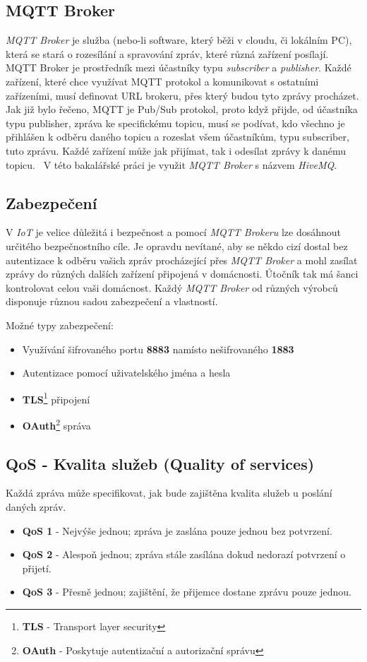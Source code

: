 \subsection{MQTT Broker}
\emph{MQTT Broker} je služba (nebo-li software, který běži v cloudu, či lokálním PC), která se stará o rozesílání a spravování zpráv, které různá zařízení posílají. MQTT Broker je prostředník mezi účastníky typu \emph{subscriber} a \emph{publisher}.
Každé zařízení, které chce využívat MQTT protokol a komunikovat s ostatními zařízeními, musí definovat URL brokeru, přes který budou tyto zprávy procházet.
Jak již bylo řečeno, MQTT je Pub/Sub protokol, proto když přijde, od účastníka typu publisher, zpráva ke specifickému topicu, musí se podívat, kdo všechno je přihlášen k odběru daného topicu a rozeslat všem účastníkům, typu subscriber, tuto zprávu.
Každé zařízení může jak přijímat, tak i odesílat zprávy k danému topicu.~\cite{wiki:mqtt_broker} V této bakalářské práci je využit \emph{MQTT Broker} s názvem \emph{HiveMQ}.

\subsection{Zabezpečení}
V \emph{IoT} je velice důležitá i bezpečnost a pomocí \emph{MQTT Brokeru} lze dosáhnout určitého bezpečnostního cíle. Je opravdu nevítané, aby se někdo cizí dostal bez autentizace k odběru vašich
zpráv procházející přes \emph{MQTT Broker} a mohl zasílat zprávy do různých dalších zařízení připojená v domácnosti.
Útočník tak má šanci kontrolovat celou vaši domácnost. Každý \emph{MQTT Broker} od různých výrobců disponuje různou sadou zabezpečení a vlastností.~\cite{wiki:mqtt_broker}

Možné typy zabezpečení:
\begin{itemize}
  \item Využívání šifrovaného portu \textbf{8883} namísto nešifrovaného \textbf{1883}
  \item Autentizace pomocí uživatelského jména a hesla
  \item \textbf{TLS}\footnote{\textbf{TLS} - Transport layer security} připojení
  \item \textbf{OAuth}\footnote{\textbf{OAuth} - Poskytuje autentizační a autorizační správu} správa
\end{itemize}
\subsection{QoS - Kvalita služeb (Quality of services)}
Každá zpráva může specifikovat, jak bude zajištěna kvalita služeb u poslání daných zpráv.~\cite{wiki:mqtt_broker}
\begin{itemize}
  \item \textbf{QoS 1} - Nejvýše jednou; zpráva je zaslána pouze jednou bez potvrzení.
  \item \textbf{QoS 2} - Alespoň jednou; zpráva stále zasílána dokud nedorazí potvrzení o přijetí.
  \item \textbf{QoS 3} - Přesně jednou; zajištění, že přijemce dostane zprávu pouze jednou.
\end{itemize}

